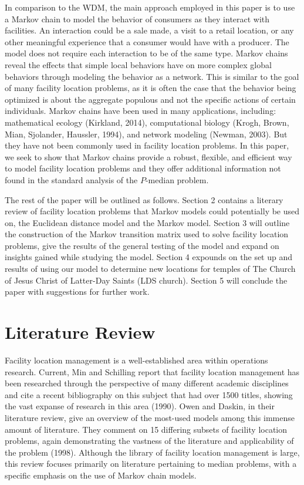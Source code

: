 \documentclass[twoside,twocolumn]{article}
\begin{document}
In comparison to the WDM, the main approach employed in this paper is to use a Markov chain to model the behavior of consumers as they interact with facilities. 
An interaction could be a sale made, a visit to a retail location, or any other meaningful experience that a consumer would have with a producer.
The model does not require each interaction to be of the same type.
Markov chains reveal the effects that simple local behaviors have on more complex global behaviors through modeling the behavior as a network. %
This is similar to the goal of many facility location problems, as it is often the case that the behavior being optimized is about the aggregate populous and not the specific actions of certain individuals.
Markov chains have been used in many applications, including: mathematical ecology (Kirkland, 2014), computational biology (Krogh, Brown, Mian, Sjolander, Haussler, 1994), and network modeling (Newman, 2003). %
But they have not been commonly used in facility location problems. %
In this paper, we seek to show that Markov chains provide a robust, flexible, and efficient way to model facility location problems and they offer additional information not found in the standard analysis of the $P$-median problem.

The rest of the paper will be outlined as follows.
Section 2 contains a literary review of facility location problems that Markov models could potentially be used on, the Euclidean distance model and the Markov model. %
Section 3 will outline the construction of the Markov transition matrix used to solve facility location problems, give the results of the general testing of the model and expand on insights gained while studying the model.
Section 4 expounds on the set up and results of using our model to determine new locations for temples of The Church of Jesus Christ of Latter-Day Saints (LDS church).
Section 5 will conclude the paper with suggestions for further work.

\section{Literature Review}

Facility location management is a well-established area within operations research. %
Current, Min and Schilling report that facility location management has been researched through the perspective of many different academic disciplines and cite a recent bibliography on this subject that had over 1500 titles, showing the vast expanse of research in this area (1990). %
Owen and Daskin, in their literature review, give an overview of the most-used models among this immense amount of literature.
They comment on 15 differing subsets of facility location problems, again demonstrating the vastness of the literature and applicability of the problem (1998).
Although the library of facility location management is large, this review focuses primarily on literature pertaining to median problems, with a specific emphasis on the use of Markov chain models. %
\end{document}
